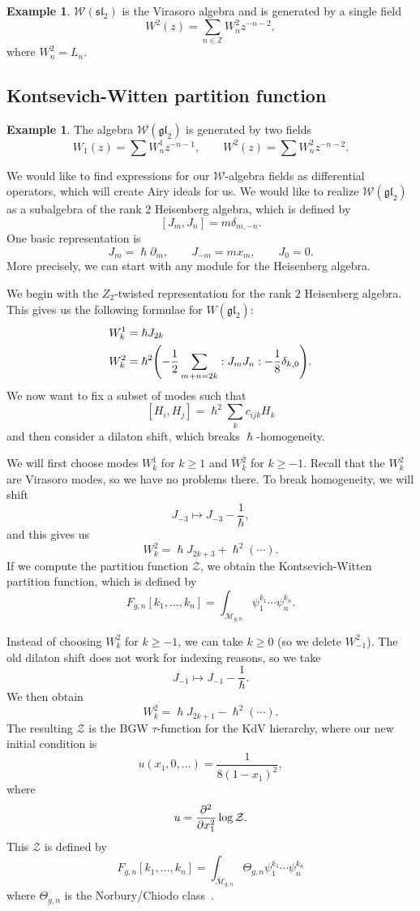 \documentclass[leqno, openany]{memoir}
\theoremstyle{definition}
\newtheorem{exm}[thm]{Example}
\theoremstyle{remark}
\theoremstyle{plain}
\theoremstyle{definition}
\theoremstyle{remark}
\newcommand{\Z}{\mathbb{Z}}
\newcommand{\mc}[1]{\mathcal{#1}}
\newcommand{\mf}[1]{\mathfrak{#1}}
\newcommand{\ol}[1]{\overline{#1}}
\begin{document}
\begin{exm}
    $\mc{W}(\mf{sl}_2)$ is the Virasoro algebra and is generated by a single field 
    \[ W^2(z) = \sum_{n \in \Z} W_n^2 z^{-n-2}, \]
    where $W_n^2 = L_n$.
\end{exm}

\subsection{Kontsevich-Witten partition function}

\begin{exm}
    The algebra $\mc{W}(\mf{gl}_2)$ is generated by two fields
    \[ W_1(z) = \sum W_n^1 z^{-n-1}, \qquad W^2(z) = \sum W_n^2 z^{-n-2}. \]
\end{exm}

We would like to find expressions for our $\mc{W}$-algebra fields as differential operators, which will create Airy ideals for us. We would like to realize $\mc{W}(\mf{gl}_2)$ as a subalgebra of the rank 2 Heisenberg algebra, which is defined by
\[ [J_m, J_n] = m \delta_{m,-n}. \]
One basic representation is
\[ J_m = \hslash \partial_m, \qquad J_{-m} = m x_m, \qquad J_0 = 0. \]
More precisely, we can start with any module for the Heisenberg algebra.

We begin with the $Z_2$-twisted representation for the rank $2$ Heisenberg algebra. This gives us the following formulae for $W(\mf{gl}_2)$:
\begin{align*}
    W_k^1 &= \hslash J_{2k} \\
    W_k^2 &= \hslash^2 \qty(-\frac{1}{2} \sum_{m+n=2k} :J_m J_n: - \frac{1}{8} \delta_{k,0}).
\end{align*}
We now want to fix a subset of modes such that
\[ [H_i, H_j] = \hslash^2 \sum_k c_{ijk} H_k \]
and then consider a dilaton shift, which breaks $\hslash$-homogeneity.

We will first choose modes $W_k^1$ for $k \geq 1$ and $W_k^2$ for $k \geq -1$. Recall that the $W_k^2$ are Virasoro modes, so we have no problems there. To break homogeneity, we will shift
\[ J_{-3} \mapsto J_{-3} - \frac{1}{\hslash}, \]
and this gives us
\[ W_k^2 = \hslash J_{2k+3} + \hslash^2(\cdots). \]
If we compute the partition function $\mc{Z}$, we obtain the Kontsevich-Witten partition function, which is defined by
\[ F_{g,n}[k_1, \ldots, k_n] = \int_{\ol{\mc{M}}_{g, n}} \psi_1^{k_1} \cdots \psi_n^{k_n}. \]

Instead of choosing $W_k^2$ for $k \geq -1$, we can take $k \geq 0$ (so we delete $W_{-1}^2$). The old dilaton shift does not work for indexing reasons, so we take
\[ J_{-1} \mapsto J_{-1} - \frac{1}{\hslash}. \]
We then obtain
\[ W_k^2 = \hslash J_{2k+1} - \hslash^2(\cdots). \]
The resulting $\mc{Z}$ is the BGW $\tau$-function for the KdV hierarchy, where our new initial condition is
\[ u(x_1, 0, \ldots) = \frac{1}{8(1-x_1)^2}, \]
where
\[ u = \pdv[2]{x_1} \log \mc{Z}. \]
This $\mc{Z}$ is defined by
\[ F_{g, n}[k_1, \ldots, k_n] = \int_{\ol{\mc{M}}_{g, n}} \Theta_{g,n} \psi_1^{k_1} \cdots \psi_n^{k_n} \]
where $\Theta_{g,n}$ is the Norbury/Chiodo class~\cite{northetaclass}.
\end{document}
